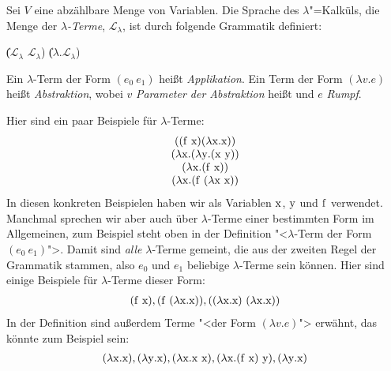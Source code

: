 \begin{definition}
  
  Sei $V$ eine abzählbare Menge von Variablen. 
  Die Sprache des $\lambda$"=Kalküls, die Menge der
  \textit{$\lambda$-Terme},
  $\mathcal{L}_{\lambda}$, ist
  durch folgende Grammatik definiert:
  \begin{grammar}
     \: 
    \> \| ($\mathcal{L}_{\lambda}$ $\mathcal{L}_{\lambda}$)
    \> \| ($\lambda$.$\mathcal{L}_{\lambda}$)
  \end{grammar}
%
  Ein $\lambda$-Term der Form $(e_0~e_1)$ heißt
  \textit{Applikation}. Ein Term der Form
  $(\lambda v.e)$ heißt \textit{Abstraktion}, wobei
  $v$ \textit{Parameter der Abstraktion} heißt und
  $e$ \textit{Rumpf}.
\end{definition}
%
Hier sind ein paar Beispiele für $\lambda$-Terme:
%
\begin{displaymath}
  \begin{array}{c}
    ((\mathrm f~\mathrm x)
    (\lambda \mathrm x.\mathrm x))\\
    (\lambda \mathrm x.(\lambda \mathrm y.(\mathrm x~\mathrm y))\\
    (\lambda \mathrm x.(\mathrm f~\mathrm x))\\
    (\lambda \mathrm x.(\mathrm f~(\lambda \mathrm x~\mathrm x))
  \end{array}
\end{displaymath}
% 
In diesen konkreten Beispielen haben wir als Variablen $\mathrm x$, $\mathrm y$ und
$\mathrm f$ verwendet.  Manchmal sprechen wir aber auch über
$\lambda$-Terme einer bestimmten Form im Allgemeinen, zum Beispiel
steht oben in der Definition "<$\lambda$-Term der Form
$(e_0~e_1)$">. Damit sind \emph{alle} $\lambda$-Terme gemeint, die aus der
zweiten Regel der Grammatik stammen, also $e_0$ und $e_1$ beliebige
$\lambda$-Terme sein können.  Hier sind einige Beispiele für
$\lambda$-Terme dieser Form:
%
\begin{displaymath}
  \begin{array}{c}
    (\mathrm f~\mathrm x),
    (\mathrm f~(\lambda \mathrm x.\mathrm x)),
    ((\lambda \mathrm x.\mathrm x)~(\lambda \mathrm x.\mathrm x))
  \end{array}
\end{displaymath}
%
In der Definition sind außerdem Terme "<der Form $(\lambda v.e)$">
erwähnt, das könnte zum Beispiel sein:
%
\begin{displaymath}
  \begin{array}{c}
    (\lambda \mathrm x.\mathrm x),
    (\lambda \mathrm y.\mathrm x),
    (\lambda \mathrm x.\mathrm x~\mathrm x),
    (\lambda \mathrm x.(\mathrm f~\mathrm x)~\mathrm y),
    (\lambda \mathrm y.\mathrm x)
  \end{array}
\end{displaymath}
%

